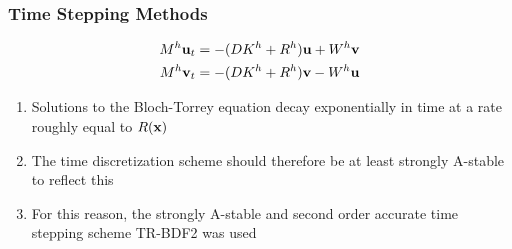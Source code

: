 \begin{frame}
\frametitle{Time Stepping Methods}
\begin{align*}
        M^h \mathbf{u}_t &= -(D K^h + R^h) \mathbf{u} + W^h \mathbf{v}\\
        M^h \mathbf{v}_t &= -(D K^h + R^h) \mathbf{v} - W^h \mathbf{u}
\end{align*}
\vspace{-0.5cm}
\begin{enumerate}
    \item Solutions to the Bloch-Torrey equation decay exponentially in time at a rate roughly equal to $R(\mathbf{x})$
    \item The time 
discretization scheme should therefore be at least strongly A-stable to reflect this
    \item For this reason, the strongly A-stable and second order accurate time stepping scheme \textsc{TR-BDF2} was used
\end{enumerate}
\end{frame}



